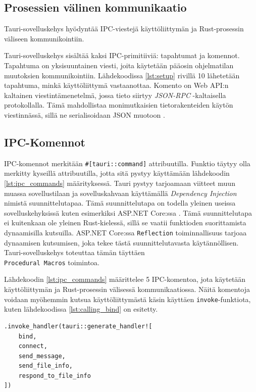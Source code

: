 \documentclass[a4paper,12pt]{article}
\begin{document}
    \subsection{Prosessien välinen kommunikaatio}
    Tauri-sovelluskehys hyödyntää IPC-viestejä käyttöliittymän ja Rust-prosessin väliseen kommunikointiin.

    Tauri-sovelluskehys sisältää kaksi IPC-primitiiviä: tapahtumat ja komennot.
    Tapahtuma on yksisuuntainen viesti, joita käytetään pääosin ohjelmatilan muutoksien kommunikointiin. Lähdekoodissa \ref{lst:setup} rivillä 10 lähetetään tapahtuma, minkä käyttöliittymä vastaanottaa. Komento on Web API:n kaltainen viestintämenetelmä, jossa tieto siirtyy \textit{JSON-RPC} -kaltaisella protokollalla. Tämä mahdollistaa monimutkaisien tietorakenteiden käytön viestinnässä, sillä ne serialisoidaan JSON muotoon \cite{tauri-app}.

    \subsection{IPC-Komennot}
    IPC-komennot merkitään \lstinline{#[tauri::command]} attribuutilla. Funktio täytyy olla merkitty kyseillä attribuutilla, jotta sitä pystyy käyttämään lähdekoodin \ref{lst:ipc_commands} määrityksessä. Tauri pystyy tarjoamaan viitteet muun muassa sovellustilaan ja sovelluskahvaan käyttämällä \textit{Dependency Injection} nimistä suunnittelutapaa. Tämä suunnittelutapa on todella yleinen useissa sovelluskehyksissä kuten esimerkiksi ASP.NET Core:ssa \cite{DI_dotnet}. Tämä suunnittelutapa ei kuitenkaan ole yleinen Rust-kielessä, sillä se vaatii funktioden suorittamista dynaamisilla kutsuilla.
    ASP.NET Core:ssa \lstinline{Reflection} toiminnallisuus tarjoaa dynaamisen kutsumisen, joka tekee tästä suunnittelutavasta käytännöllisen.
    Tauri-sovelluskehys toteuttaa tämän täyttäen \\ \lstinline{Procedural Macros} toimintoa. 


    Lähdekoodin \ref{lst:ipc_commands} määrittelee 5 IPC-komentoa, jota käytetään käyttöliittymän ja Rust-prosessin välisessä kommunikaatiossa. Näitä komentoja voidaan myöhemmin kutsua käyttöliittymästä käsin käyttäen \lstinline{invoke}-funktiota, kuten lähdekoodissa \ref{lst:calling_bind} on esitetty. \par

    \begin{lstlisting}[caption={IPC-komentojen määritys}, label={lst:ipc_commands}]
.invoke_handler(tauri::generate_handler![
    bind,
    connect,
    send_message,
    send_file_info,
    respond_to_file_info
])\end{lstlisting}
\end{document}
